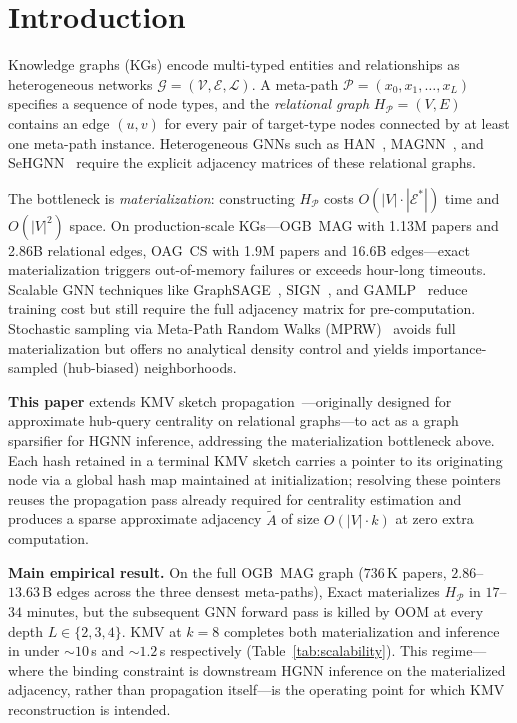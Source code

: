 \documentclass[sigconf]{acmart}
\begin{document}
\maketitle

\section{Introduction}
\label{sec:intro}

Knowledge graphs (KGs) encode multi-typed entities and relationships as heterogeneous networks $\mathcal{G} = (\mathcal{V}, \mathcal{E}, \mathcal{L})$.
A meta-path $\mathcal{P} = (x_0, x_1, \ldots, x_L)$ specifies a sequence of node types, and the \emph{relational graph} $H_\mathcal{P} = (V, E)$ contains an edge $(u, v)$ for every pair of target-type nodes connected by at least one meta-path instance.
Heterogeneous GNNs such as HAN~\cite{wang2019han}, MAGNN~\cite{fu2020magnn}, and SeHGNN~\cite{yang2023sehgnn} require the explicit adjacency matrices of these relational graphs.

The bottleneck is \emph{materialization}: constructing $H_\mathcal{P}$ costs $O(|V| \cdot |\mathcal{E}^*|)$ time and $O(|V|^2)$ space.
On production-scale KGs---OGB~MAG with 1.13M papers and 2.86B relational edges, OAG~CS with 1.9M papers and 16.6B edges---exact materialization triggers out-of-memory failures or exceeds hour-long timeouts.
Scalable GNN techniques like GraphSAGE~\cite{hamilton2017sage}, SIGN~\cite{frasca2020sign}, and GAMLP~\cite{zhang2022gamlp} reduce training cost but still require the full adjacency matrix for pre-computation.
Stochastic sampling via Meta-Path Random Walks (MPRW)~\cite{dong2017metapath2vec} avoids full materialization but offers no analytical density control and yields importance-sampled (hub-biased) neighborhoods.

\textbf{This paper} extends KMV sketch propagation~\cite{berahmand2024kmv}---originally designed for approximate hub-query centrality on relational graphs---to act as a graph sparsifier for HGNN inference, addressing the materialization bottleneck above.
Each hash retained in a terminal KMV sketch carries a pointer to its originating node via a global hash map maintained at initialization; resolving these pointers reuses the propagation pass already required for centrality estimation and produces a sparse approximate adjacency $\widetilde{A}$ of size $O(|V| \cdot k)$ at zero extra computation.

\textbf{Main empirical result.} On the full OGB~MAG graph ($736$\,K papers, $2.86$--$13.63$\,B edges across the three densest meta-paths), Exact materializes $H_\mathcal{P}$ in $17$--$34$ minutes, but the subsequent GNN forward pass is killed by OOM at every depth $L \in \{2,3,4\}$. KMV at $k{=}8$ completes both materialization and inference in under $\sim$$10$\,s and $\sim$$1.2$\,s respectively (Table~\ref{tab:scalability}). This regime---where the binding constraint is downstream HGNN inference on the materialized adjacency, rather than propagation itself---is the operating point for which KMV reconstruction is intended.
\end{document}
